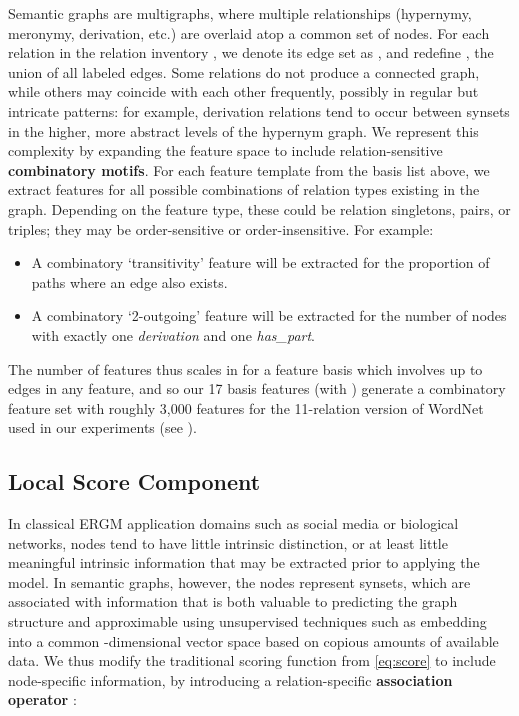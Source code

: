 \documentclass[11pt,twocolumn]{article}
\newcommand{\mg}[0]{multigraph}
\newcommand{\WN}[0]{WordNet}
\newcommand{\ergm}[0]{ERGM}
\begin{document}
Semantic graphs are \mg s, where multiple relationships (hypernymy, meronymy, derivation, etc.) are overlaid atop a common set of nodes.
For each relation  in the relation inventory , we denote its edge set as , and redefine , the union of all labeled edges.
Some relations do not produce a connected graph, while others may coincide with each other frequently, possibly in regular but intricate patterns: for example, derivation relations tend to occur between synsets in the higher, more abstract levels of the hypernym graph. 
We represent this complexity by expanding the feature space to include relation-sensitive \textbf{combinatory motifs}.
For each feature template from the basis list above, we extract features for all possible combinations of relation types existing in the graph.
Depending on the feature type, these could be relation singletons, pairs, or triples; they may be order-sensitive or order-insensitive.
For example:
\begin{itemize}
  \item A combinatory `transitivity' feature will be extracted for the proportion of paths  where an edge  also exists.
  \item A combinatory `2-outgoing' feature will be extracted for the number of nodes with exactly one \textit{derivation} and one \textit{has\_part}.
  \end{itemize}
The number of features thus scales in 
for a feature basis which involves up to  edges in any feature,
and so our 17 basis features (with ) generate a combinatory feature set with roughly 3,000 features for the 11-relation version of \WN{} used in our experiments (see ).


\subsection{Local Score Component}
\label{ssec:local}
In classical \ergm{} application domains such as social media or biological networks, nodes tend to have little intrinsic distinction, or at least little meaningful intrinsic information that may be extracted prior to applying the model.
In semantic graphs, however, the nodes represent synsets, which are associated with information that is both valuable to predicting the graph structure and approximable using unsupervised techniques such as embedding into a common -dimensional vector space based on copious amounts of available data.
We thus modify the traditional scoring function from \cref{eq:score} to include node-specific information, by introducing a relation-specific
\textbf{association operator} :
\end{document}

